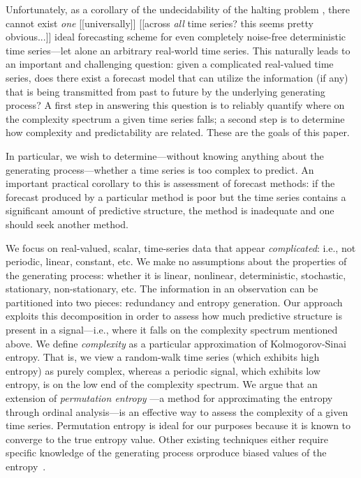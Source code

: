 Unfortunately, as a corollary of the undecidability of the halting
problem \cite{halting-problem}, there cannot exist \emph{one}
[[universally]] [[across {\sl all} time series?  this seems pretty
    obvious...]] ideal forecasting scheme for even completely
noise-free deterministic time series\cite{weigend-book}---let alone an
arbitrary real-world time series.  This naturally leads to an
important and challenging question: given a complicated real-valued
time series, does there exist a forecast model that can utilize the
information (if any) that is being transmitted from past to future by
the underlying generating process?  A first step in answering this
question is to reliably quantify where on the complexity spectrum a
given time series falls; a second step is to determine how complexity
and predictability are related.  These are the goals of this paper.

In particular, we wish to determine---without knowing anything about
the generating process---whether a time series is too complex to
predict.  An important practical corollary to this is assessment of
forecast methods: if the forecast produced by a particular method is
poor but the time series contains a significant amount of predictive
structure, the method is inadequate and one should seek another
method.  

We focus on real-valued, scalar, time-series data that appear
\emph{complicated}: i.e., not periodic, linear, constant, etc.  We
make no assumptions about the properties of the generating process:
whether it is linear, nonlinear, deterministic, stochastic,
stationary, non-stationary, etc.  The information in an observation
can be partitioned into two pieces: redundancy and entropy
generation\cite{crutchfield2003}.  Our approach exploits this
decomposition in order to assess how much predictive structure is
present in a signal---i.e., where it falls on the complexity spectrum
mentioned above.  We define \emph{complexity} as a particular
approximation of Kolmogorov-Sinai entropy\cite{KS-entropy}.  That is,
we view a random-walk time series (which exhibits high entropy) as
purely complex, whereas a periodic signal, which exhibits low entropy,
is on the low end of the complexity spectrum.  We argue that an
extension of \emph{permutation entropy} \cite{bandt2002per}---a method
for approximating the entropy through ordinal analysis---is an
effective way to assess the complexity of a given time series.
Permutation entropy is ideal for our purposes because it is known to
converge to the true entropy value. Other existing techniques either require specific knowledge of the generating process orproduce biased values of the entropy~\cite{bollt2001}.

